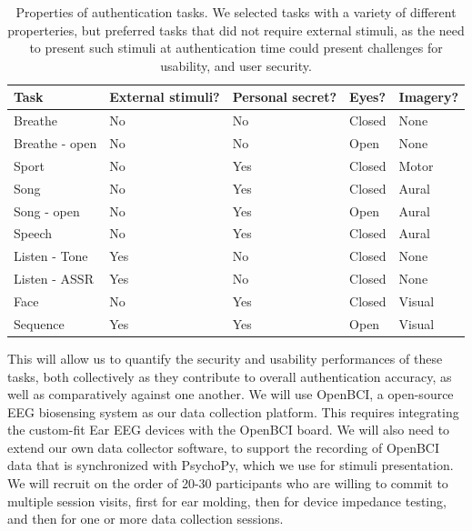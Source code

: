 \documentclass[11pt]{article}
\begin{document}
\begin{table}[h]
\centering
\begin{tabular}{lllll}
Task & External stimuli? & Personal secret? & Eyes? & Imagery?\\
\hline
Breathe & No & No & Closed & None\\
Breathe - open & No & No & Open & None\\
Sport & No & Yes & Closed & Motor\\
Song & No & Yes & Closed & Aural\\
Song - open & No & Yes & Open & Aural\\
Speech & No & Yes & Closed & Aural\\
Listen - Tone & Yes & No & Closed & None\\
Listen - ASSR & Yes & No & Closed & None\\
Face & No & Yes & Closed & Visual\\
Sequence & Yes & Yes & Open & Visual\\
\hline
\end{tabular}
\caption{Properties of authentication tasks. We selected tasks with a variety of different properteries, but preferred tasks that did not require external stimuli, as the need to present such stimuli at authentication time could present challenges for usability, and user security.}
\end{table}

This will allow us to quantify the security and usability performances of these
tasks, both collectively as they contribute to overall authentication accuracy, as
well as comparatively against one another.
We will use OpenBCI, a open-source EEG biosensing system as our data
collection platform. This requires integrating the custom-fit Ear EEG devices with
the OpenBCI board. We will also need to extend our own data collector
software, to support the recording of OpenBCI data that is synchronized with
PsychoPy, which we use for stimuli presentation. We will recruit on the order of
20-30 participants who are willing to commit to multiple session visits, first for ear
molding, then for device impedance testing, and then for one or more data
collection sessions.
\end{document}
